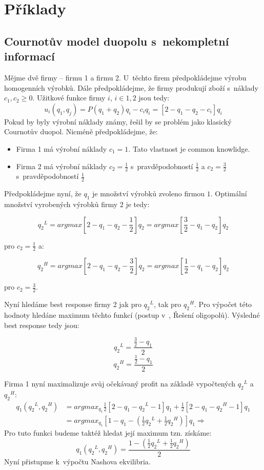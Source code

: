 \documentclass[12pt,a4paper,titlepage,final]{article}
\begin{document}
\section{Příklady}
\subsection{Cournotův model duopolu s~nekompletní informací}
Mějme dvě firmy -- firmu 1 a firmu 2.
U~těchto firem předpokládejme výrobu homogenních výrobků.
Dále předpokládejme, že firmy produkují zboží s~náklady $c_1, c_2 \geq 0.$
Užitkové funkce firmy $i$, $i \in {1, 2}$ jsou tedy:
$$u_i(q_1, q_j) = P(q_1 + q_2)q_i - c_i q_i = [ 2 - q_1 - q_2 - c_i] q_i$$
Pokud by byly výrobní náklady známy, řešil by se problém jako klasický Cournotův duopol.
Nicméně předpokládejme, že:
\begin{itemize}
 \item Firma 1 má výrobní náklady $c_1 = 1$. Tato vlastnost je common knowlidge.
 \item Firma 2 má výrobní náklady $c_2 = \frac{1}{2}$ s~pravděpodobností $\frac{1}{2}$ a $c_2 = \frac{3}{2}$ s~pravděpodobností $\frac{1}{2}$
\end{itemize}

Předpokládejme nyní, že $q_1$ je množství výrobků zvoleno firmou $1$.
Optimální množství vyrobených výrobků firmy $2$ je tedy:

$$ {q_2}^L = arg max [2 - q_1 - q_2 - \frac{1}{2}]q_2 = arg max[\frac{3}{2} - q_1 - q_2]q_2 $$

pro $c_2 = \frac{1}{2}$ a:

$$ {q_2}^H = arg max [2 - q_1 - q_2 - \frac{3}{2}]q_2 = arg max[\frac{1}{2} - q_1 - q_2]q_2 $$

pro $c_2 = \frac{3}{2}$.

Nyní hledáme best response firmy 2 jak pro ${q_2}^L$, tak pro ${q_2}^H$.
Pro výpočet této hodnoty hledáne maximum těchto funkcí (postup v~\cite{bgames-hrubym}, Řešení oligopolů).
Výsledné best response tedy jsou:

$$
{q_2}^L = \frac{\frac{3}{2} - q_1}{2}
$$
$$
{q_2}^H = \frac{\frac{1}{2} - q_1}{2}
$$

Firma 1 nyní maximalizuje svůj očekávaný profit na základě vypočtených ${q_2}^L$ a ${q_2}^H$:
\begin{align*}
q_1({q_2}^L, {q_2}^H) &= arg max_{q_1} \frac{1}{2}[2 - q_1 - {q_2}^L - 1]q_1 + \frac{1}{2}[2 - q_1 - {q_2}^H - 1] q_1 \\
&= arg max_{q_1} [1 - q_1 - (\frac{1}{2}{q_2}^L + \frac{1}{2}{q_2}^H)]q_1 \Rightarrow
\end{align*}
Pro tuto funkci budeme taktéž hledat její maximum tzn. získáme:
$$
q_1({q_2}^L, {q_2}^H) = \frac{1 - (\frac{1}{2} {q_2}^L + \frac{1}{2} {q_2}^H)}{2}
$$
Nyní přistupme k~výpočtu Nashova ekvilibria.
\end{document}
